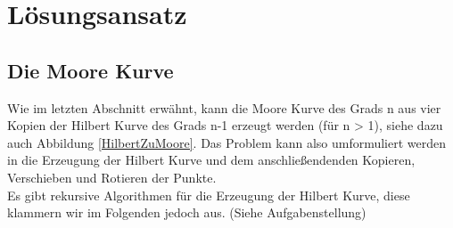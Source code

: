 \documentclass[course=erap]{aspdoc}
\begin{document}


\section{Lösungsansatz}

\subsection{Die Moore Kurve}

Wie im letzten Abschnitt erwähnt, kann die Moore Kurve des Grads n aus vier Kopien der Hilbert Kurve des Grads n-1 erzeugt werden (für n > 1), siehe dazu auch Abbildung \ref{HilbertZuMoore}.
Das Problem kann also umformuliert werden in die Erzeugung der Hilbert Kurve und dem anschließendenden Kopieren, Verschieben und Rotieren der Punkte. 
\\
Es gibt rekursive Algorithmen für die Erzeugung der Hilbert Kurve, diese klammern wir im Folgenden jedoch aus. (Siehe Aufgabenstellung)
\end{document}
